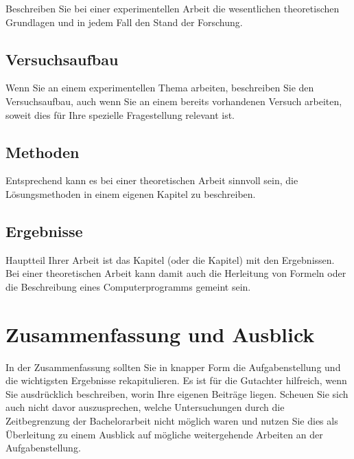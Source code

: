 \documentclass[a4paper,11pt,oneside,final,german,openbib,pdftex]{scrbook}
\begin{document}
Beschreiben Sie bei einer experimentellen Arbeit die wesentlichen 
theoretischen Grundlagen und in jedem Fall den Stand der Forschung.

\section{Versuchsaufbau}

Wenn Sie an einem experimentellen Thema arbeiten, beschreiben Sie 
den Versuchsaufbau, auch wenn Sie an einem bereits vorhandenen 
Versuch arbeiten, soweit dies f\"ur Ihre spezielle Fragestellung 
relevant ist. 

\section{Methoden}

Entsprechend kann es bei einer theoretischen Arbeit sinnvoll sein,
die L\"osungsmethoden in einem eigenen Kapitel zu beschreiben.

\section{Ergebnisse}

Hauptteil Ihrer Arbeit ist das Kapitel (oder die Kapitel) mit den 
Ergebnissen. Bei einer theoretischen Arbeit kann damit auch 
die Herleitung von Formeln oder die Beschreibung eines Computerprogramms 
gemeint sein.

\chapter{Zusammenfassung und Ausblick}

In der Zusammenfassung sollten Sie in knapper Form die Aufgabenstellung 
und die wichtigsten Ergebnisse rekapitulieren. Es ist f\"ur die 
Gutachter hilfreich, wenn Sie ausdr\"ucklich beschreiben, worin 
Ihre eigenen Beitr\"age liegen. Scheuen Sie sich auch nicht davor 
auszusprechen, welche Untersuchungen durch die Zeitbegrenzung der 
Bachelorarbeit nicht m\"oglich waren und nutzen Sie dies als 
\"Uberleitung zu einem Ausblick auf m\"ogliche weitergehende 
Arbeiten an der Aufgabenstellung.
\end{document}
